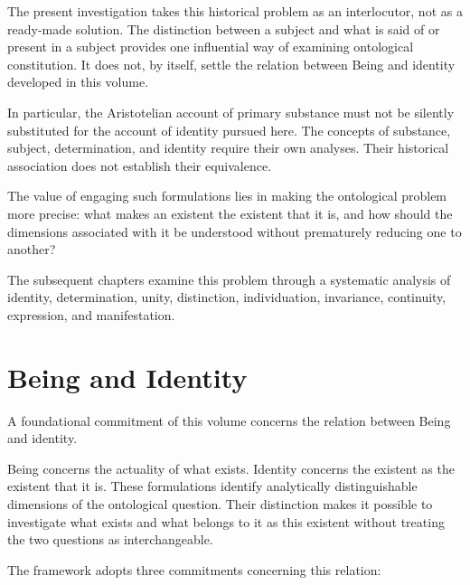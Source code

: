 The present investigation takes this historical
problem as an interlocutor, not as a ready-made
solution. The distinction between a subject and
what is said of or present in a subject provides
one influential way of examining ontological
constitution. It does not, by itself, settle
the relation between Being and identity developed
in this volume.

In particular, the Aristotelian account of primary
substance must not be silently substituted for
the account of identity pursued here. The concepts
of substance, subject, determination, and identity
require their own analyses. Their historical
association does not establish their equivalence.

The value of engaging such formulations lies
in making the ontological problem more precise:
what makes an existent the existent that it is,
and how should the dimensions associated with
it be understood without prematurely reducing
one to another?

The subsequent chapters examine this problem
through a systematic analysis of identity,
determination, unity, distinction, individuation,
invariance, continuity, expression, and manifestation.



\section*{Being and Identity}

A foundational commitment of this volume concerns
the relation between Being and identity.

Being concerns the actuality of what exists.
Identity concerns the existent as the existent
that it is. These formulations identify analytically
distinguishable dimensions of the ontological
question. Their distinction makes it possible
to investigate what exists and what belongs to
it as this existent without treating the two
questions as interchangeable.

The framework adopts three commitments concerning
this relation:


